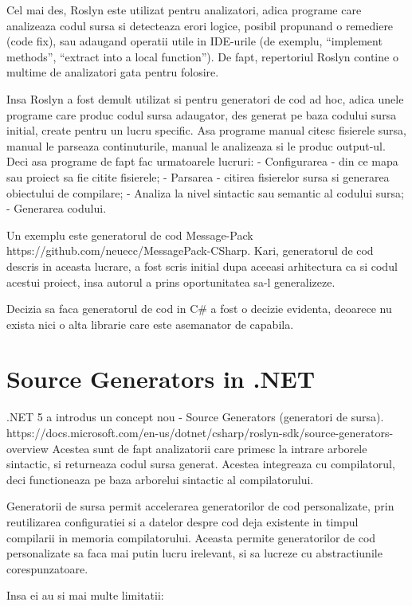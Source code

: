 \documentclass{report}
\begin{document}
Cel mai des, Roslyn este utilizat pentru analizatori, adica programe
care analizeaza codul sursa si detecteaza erori logice, posibil
propunand o remediere (code fix), sau adaugand operatii utile in
IDE-urile (de exemplu, ``implement methods'', ``extract into a local
function''). De fapt, repertoriul Roslyn contine o multime de
analizatori gata pentru folosire.

Insa Roslyn a fost demult utilizat si pentru generatori de cod ad hoc,
adica unele programe care produc codul sursa adaugator, des generat pe
baza codului sursa initial, create pentru un lucru specific. Asa
programe manual citesc fisierele sursa, manual le parseaza
continuturile, manual le analizeaza si le produc output-ul. Deci asa
programe de fapt fac urmatoarele lucruri: - Configurarea - din ce mapa
sau proiect sa fie citite fisierele; - Parsarea - citirea fisierelor
sursa si generarea obiectului de compilare; - Analiza la nivel sintactic
sau semantic al codului sursa; - Generarea codului.

Un exemplu este generatorul de cod Message-Pack
https://github.com/neuecc/MessagePack-CSharp. Kari, generatorul de cod
descris in aceasta lucrare, a fost scris initial dupa aceeasi
arhitectura ca si codul acestui proiect, insa autorul a prins
oportunitatea sa-l generalizeze.

Decizia sa faca generatorul de cod in C\# a fost o decizie evidenta,
deoarece nu exista nici o alta librarie care este asemanator de
capabila.

\section{Source Generators in .NET}

.NET 5 a introdus un concept nou - Source Generators (generatori de
sursa).
https://docs.microsoft.com/en-us/dotnet/csharp/roslyn-sdk/source-generators-overview
Acestea sunt de fapt analizatorii care primesc la intrare arborele
sintactic, si returneaza codul sursa generat. Acestea integreaza cu
compilatorul, deci functioneaza pe baza arborelui sintactic al
compilatorului.

Generatorii de sursa permit accelerarea generatorilor de cod
personalizate, prin reutilizarea configuratiei si a datelor despre cod
deja existente in timpul compilarii in memoria compilatorului. Aceasta
permite generatorilor de cod personalizate sa faca mai putin lucru
irelevant, si sa lucreze cu abstractiunile corespunzatoare.

Insa ei au si mai multe limitatii:
\end{document}
